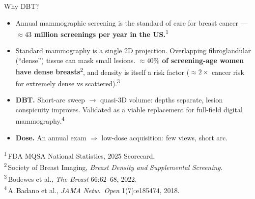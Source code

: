 \documentclass[aspectratio=169,xcolor=dvipsnames]{beamer}
\begin{document}
\begin{frame}{Why DBT?}
  \begin{itemize}
    \item Annual mammographic screening is the standard of care for
          breast cancer --- \textbf{$\approx\!43$ million screenings
          per year in the US.}\textsuperscript{1}
    \item Standard mammography is a single 2D projection. Overlapping
          fibroglandular (``dense'') tissue can mask small lesions.
          \textbf{$\approx\!40\%$ of screening-age women have dense
          breasts}\textsuperscript{2}, and density is itself a risk
          factor ($\approx\!2\times$ cancer risk for extremely dense
          vs scattered).\textsuperscript{3}
    \item \textbf{DBT.} Short-arc sweep $\rightarrow$ quasi-3D volume:
          depths separate, lesion conspicuity improves. Validated as a
          viable replacement for full-field digital
          mammography.\textsuperscript{4}
    \item \textbf{Dose.} An annual exam $\Rightarrow$ low-dose
          acquisition: few views, short arc.
  \end{itemize}
  \vspace{0.8em}
  {\scriptsize
  \textsuperscript{1}\,FDA MQSA National Statistics, 2025 Scorecard.\\
  \textsuperscript{2}\,Society of Breast Imaging,
    \emph{Breast Density and Supplemental Screening}.\\
  \textsuperscript{3}\,Bodewes et al., \emph{The Breast} 66:62--68, 2022.\\
  \textsuperscript{4}\,A.\,Badano et al., \emph{JAMA Netw.\ Open}
    1(7):e185474, 2018.\par}
\end{frame}
\end{document}
